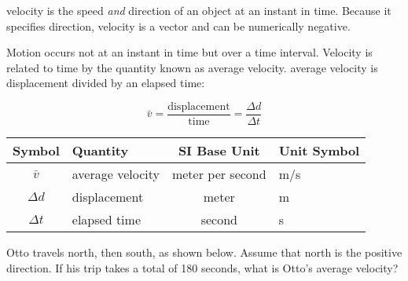 \documentclass[../main.tex]{subfiles}
\begin{document}
\Gls{velocity} is the speed \textit{and} direction of an object at an instant in time. Because it specifies direction, velocity is a vector and can be numerically negative.

\vspace{1em}

Motion occurs not at an instant in time but over a time interval. Velocity is related to time by the quantity known as average velocity. \Gls{average velocity} is displacement divided by an elapsed time:
 
\begin{equation} \label{Elg0tf}
    \bar{v} = 
   \mathrm{\frac{displacement}{time}} = \frac{\Delta{d}}{\Delta{t}}
\end{equation}


\begin{center}
    \begin{tabular}{cl|cl}
    \hline
    \textbf{Symbol} & \textbf{Quantity} & \textbf{SI Base Unit} & \textbf{Unit Symbol}  \\
    \hline\hline
        $\bar{v}$ & average velocity & meter per second & m/s\\
        $\Delta{d}$ & displacement & meter & m\\
        $\Delta t$ & elapsed time & second & s \\
    \hline
    \end{tabular}
\end{center}

\begin{example}
Otto travels north, then south, as shown below. Assume that north is the positive direction. If his trip takes a total of 180 seconds, what is Otto's average velocity?
\end{example}

\begin{center}
    \captionsetup{type=figure,margin=1in,font=scriptsize}
    \label{vds9fx}
\end{center}
\end{document}
